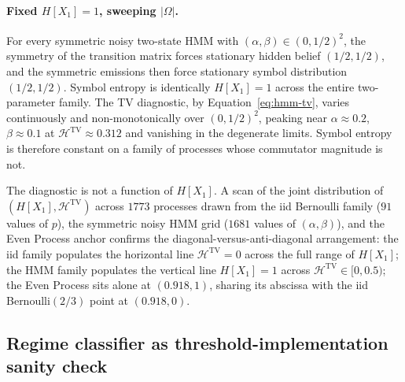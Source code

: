 \documentclass[11pt,a4paper]{article}
\theoremstyle{plain}
\theoremstyle{definition}
\theoremstyle{remark}
\begin{document}
\paragraph{Fixed $H[X_1] = 1$, sweeping $|\Omega|$.} For every symmetric noisy two-state HMM with $(\alpha, \beta) \in (0, 1/2)^2$, the symmetry of the transition matrix forces stationary hidden belief $(1/2, 1/2)$, and the symmetric emissions then force stationary symbol distribution $(1/2, 1/2)$. Symbol entropy is identically $H[X_1] = 1$ across the entire two-parameter family. The TV diagnostic, by Equation~\eqref{eq:hmm-tv}, varies continuously and non-monotonically over $(0, 1/2)^2$, peaking near $\alpha \approx 0.2$, $\beta \approx 0.1$ at $\mathcal{H}^{\mathrm{TV}} \approx 0.312$ and vanishing in the degenerate limits. Symbol entropy is therefore constant on a family of processes whose commutator magnitude is not.

The diagnostic is not a function of $H[X_1]$. A scan of the joint distribution of $(H[X_1], \mathcal{H}^{\mathrm{TV}})$ across $1773$ processes drawn from the iid Bernoulli family ($91$ values of $p$), the symmetric noisy HMM grid ($1681$ values of $(\alpha, \beta)$), and the Even Process anchor confirms the diagonal-versus-anti-diagonal arrangement: the iid family populates the horizontal line $\mathcal{H}^{\mathrm{TV}} = 0$ across the full range of $H[X_1]$; the HMM family populates the vertical line $H[X_1] = 1$ across $\mathcal{H}^{\mathrm{TV}} \in [0, 0.5)$; the Even Process sits alone at $(0.918, 1)$, sharing its abscissa with the iid Bernoulli$(2/3)$ point at $(0.918, 0)$.

\subsection{Regime classifier as threshold-implementation sanity check}
\label{subsec:classifier}
\end{document}
